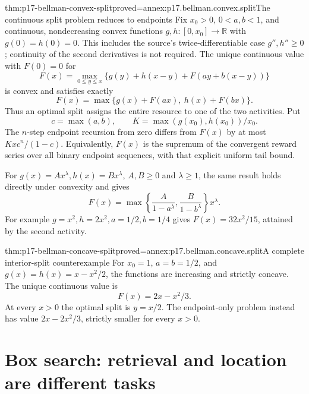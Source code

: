\begin{hbtheorem}{thm:p17-bellman-convex-split}{proved=annex:p17.bellman.convex.split}{The continuous split problem reduces to endpoints}
Fix \(x_0>0\), \(0<a,b<1\), and continuous,
nondecreasing convex functions \(g,h:[0,x_0]\to\mathbb R\)
with \(g(0)=h(0)=0\). This includes the source's
twice-differentiable case \(g'',h''\geq0\); continuity
of the second derivatives is not required.
The unique continuous value with \(F(0)=0\) for
\[
 F(x)=\max_{0\leq y\leq x}
          \{g(y)+h(x-y)+F(ay+b(x-y))\}
\]
is convex and satisfies exactly
\[
                   F(x)=\max\{g(x)+F(ax),\ h(x)+F(bx)\}.
\]
Thus an optimal split assigns the entire resource to one
of the two activities. Put
\[
 c=\max(a,b),\qquad K=\max(g(x_0),h(x_0))/x_0.
\]
The \(n\)-step endpoint recursion from zero differs from
\(F(x)\) by at most \(Kxc^n/(1-c)\).
Equivalently, \(F(x)\) is the supremum of the convergent
reward series over all binary endpoint sequences, with that
explicit uniform tail bound.

For \(g(x)=Ax^\lambda,h(x)=Bx^\lambda\), \(A,B\geq0\)
and \(\lambda\geq1\), the same result holds directly under
convexity and gives
\[
        F(x)=
          \max\!\left\{\frac A{1-a^\lambda},
                       \frac B{1-b^\lambda}\right\}x^\lambda .
\]
For example \(g=x^2,h=2x^2,a=1/2,b=1/4\) gives
\(F(x)=32x^2/15\), attained by the second activity.
\end{hbtheorem}

\begin{hbtheorem}{thm:p17-bellman-concave-split}{proved=annex:p17.bellman.concave.split}{A complete interior-split counterexample}
For \(x_0=1\), \(a=b=1/2\), and
\(g(x)=h(x)=x-x^2/2\), the functions are increasing
and strictly concave. The unique continuous value is
\[
                          F(x)=2x-x^2/3.
\]
At every \(x>0\) the optimal split is \(y=x/2\).
The endpoint-only problem instead has value
\(2x-2x^2/3\), strictly smaller for every \(x>0\).
\end{hbtheorem}

\section{Box search: retrieval and location are different tasks}

